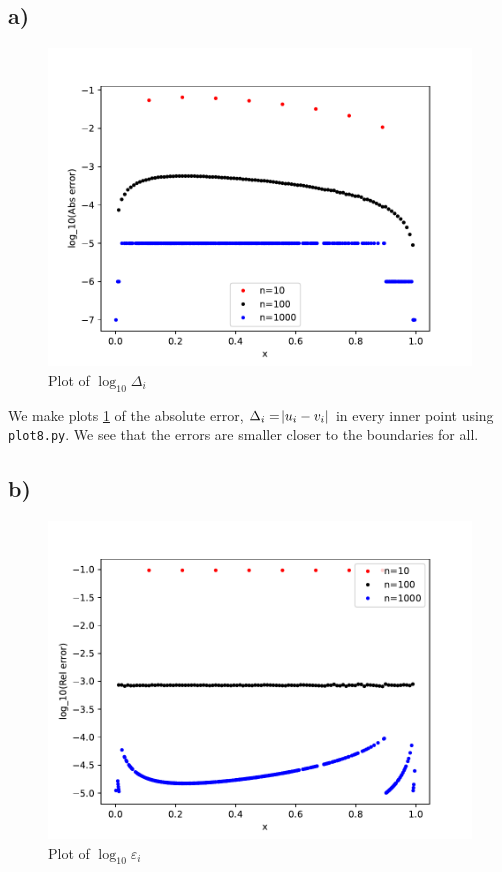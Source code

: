 \documentclass[a4paper,10pt,english]{article}
\begin{document}
\subsection{a)}
\begin{figure}[H]
  \centering
  \includegraphics[width=1.0\linewidth]{figures/plot_8a.pdf}
  \caption{Plot of $\log_{10}{\Delta_i}$}
  \label{fig_plot8a}
\end{figure}


We make plots \ref{fig_plot8a} of the absolute error, $\Delta_i = \abs{u_i - v_i}$ in every inner point using
\verb|plot8.py|. We see that the errors are smaller closer to the boundaries for all.

\subsection{b)}
\begin{figure}[H]
  \centering
  \includegraphics[width=1.0\linewidth]{figures/plot_8b.pdf}
  \caption{Plot of $\log_{10}{\varepsilon_i}$}
  \label{fig_plot8b}
\end{figure}
\end{document}

